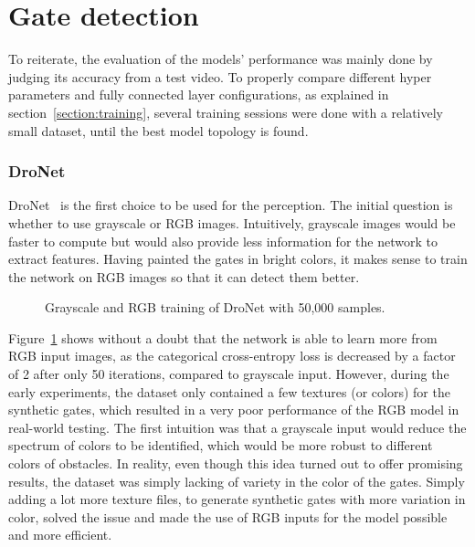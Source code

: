 \section{Gate detection}

To reiterate, the evaluation of the models' performance was mainly done by
judging its accuracy from a test video. To properly compare different
hyper parameters and fully connected layer configurations, as explained in
section~\ref{section:training}, several training sessions were done with a
relatively small dataset, until the best model topology is found.

\subsubsection{DroNet}

DroNet~\cite{dronet} is the first choice to be used for the perception. The
initial question is whether to use grayscale or RGB images. Intuitively,
grayscale images would be faster to compute but would also provide less
information for the network to extract features. Having painted the gates in
bright colors, it makes sense to train the network on RGB images so that it can
detect them better.

\begin{figure}[h]
	\centering
	
	\caption{Grayscale and RGB training of DroNet with 50,000 samples.}
	\label{plot:grayscale-vs-rgb-dronet}
\end{figure}

Figure~\ref{plot:grayscale-vs-rgb-dronet} shows without a doubt that the
network is able to learn more from RGB input images, as the categorical
cross-entropy loss is decreased by a factor of 2 after only 50 iterations,
compared to grayscale input. However, during the early experiments, the dataset
only contained a few textures (or colors) for the synthetic gates, which
resulted in a very poor performance of the RGB model in real-world testing. The
first intuition was that a grayscale input would reduce the spectrum of colors
to be identified, which would be more robust to different colors of obstacles.
In reality, even though this idea turned out to offer promising results, the
dataset was simply lacking of variety in the color of the gates. Simply adding
a lot more texture files, to generate synthetic gates with more variation in
color, solved the issue and made the use of RGB inputs for the model possible
and more efficient.\\

